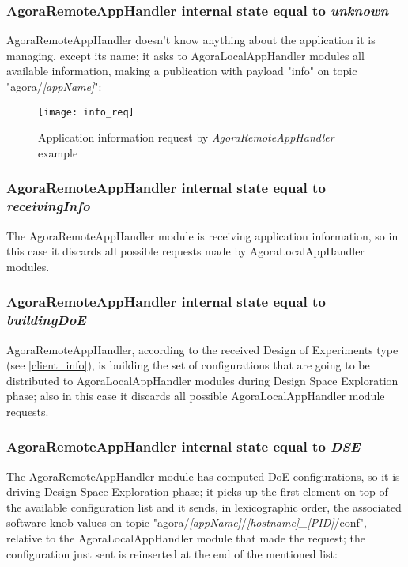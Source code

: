 \subsubsection{AgoraRemoteAppHandler internal state equal to \textit{unknown}}\label{req_info}

AgoraRemoteAppHandler doesn't know anything about the application it is managing, except its name; it asks to AgoraLocalAppHandler modules all available information, making a publication with payload "info" on topic "agora/\textit{[appName]}":

\begin{figure}[H]

    \centering
    \texttt{[image: info\_req]}
    \caption{Application information request by \textit{AgoraRemoteAppHandler} example}
    
\end{figure}


\subsubsection{AgoraRemoteAppHandler internal state equal to \textit{receivingInfo}}

The AgoraRemoteAppHandler module is receiving application information, so in this case it discards all possible requests made by AgoraLocalAppHandler modules.


\subsubsection{AgoraRemoteAppHandler internal state equal to \textit{buildingDoE}}

AgoraRemoteAppHandler, according to the received Design of Experiments type (see \ref{client_info}), is building the set of configurations that are going to be distributed to AgoraLocalAppHandler modules during Design Space Exploration phase; also in this case it discards all possible AgoraLocalAppHandler module requests.


\subsubsection{AgoraRemoteAppHandler internal state equal to \textit{DSE}}\label{dse_conf}

The AgoraRemoteAppHandler module has computed DoE configurations, so it is driving Design Space Exploration phase; it picks up the first element on top of the available configuration list and it sends, in lexicographic order, the associated software knob values on topic "agora\slash{}\textit{[appName]}\slash{}\textit{[hostname]\_[PID]}\slash{}conf", relative to the AgoraLocalAppHandler module that made the request; the configuration just sent is reinserted at the end of the mentioned list:

